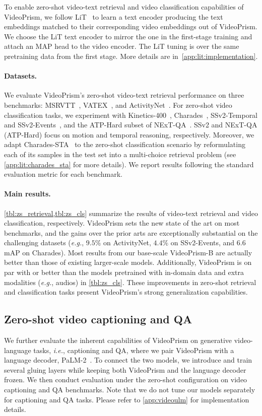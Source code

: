 \documentclass{article}
\theoremstyle{plain}
\theoremstyle{definition}
\theoremstyle{remark}
\newcommand{\OURS}{VideoPrism\xspace}
\newcommand{\ie}{\textit{i.e.}\xspace}
\newcommand{\eg}{\textit{e.g.}\xspace}
\newcommand{\myparagraph}[1]{\paragraph{#1}}
\begin{document}
To enable zero-shot video-text retrieval and video classification capabilities of \OURS, we follow LiT~\cite{zhai2022lit} to learn a text encoder producing the text embeddings matched to their corresponding video embeddings out of \OURS. We choose the LiT text encoder to mirror the one in the first-stage training and attach an MAP head to the video encoder. The LiT tuning is over the same pretraining data from the first stage. More details are in~\cref{app:lit:implementation}.

\myparagraph{Datasets.} We evaluate \OURS's zero-shot video-text retrieval performance on three benchmarks: MSRVTT~\cite{xu2016msr,bain2021frozen}, VATEX~\cite{wang2019vatex}, and ActivityNet~\cite{krishna2017dense}. For zero-shot video classification tasks, we experiment with Kinetics-400~\cite{kay2017kinetics}, Charades~\cite{sigurdsson2016hollywood}, SSv2-Temporal and SSv2-Events~\cite{sevilla2021only,bagad2023test}, and the ATP-Hard subset of NExT-QA~\cite{buch2022revisiting}. 
SSv2 and NExT-QA (ATP-Hard) focus on motion and temporal reasoning, respectively. 
Moreover, we adapt Charades-STA~\cite{gao2017tall} to the zero-shot classification scenario by reformulating each of its samples in the test set into a multi-choice retrieval problem (see \cref{app:lit:charades_sta} for more details). 
We report results following the standard evaluation metric for each benchmark.

\myparagraph{Main results.} \cref{tbl:zs_retrieval,tbl:zs_cls} summarize the results of video-text retrieval and video classification, respectively. \OURS sets the new state of the art on most benchmarks, and the gains over the prior arts are exceptionally substantial on the challenging datasets (\eg, $9.5\%$ on ActivityNet, $4.4\%$ on SSv2-Events, and $6.6$ mAP on Charades). Most results from our base-scale \OURS-B are actually better than those of existing larger-scale models. Additionally, \OURS is on par with or better than the models pretrained with in-domain data and extra modalities (\eg, audios) in \cref{tbl:zs_cls}. These improvements in zero-shot retrieval and classification tasks present \OURS's strong generalization capabilities.


\subsection{Zero-shot video captioning and QA}\label{sec:exp:cap_vqa} 


We further evaluate the inherent capabilities of \OURS on generative video-language tasks, \ie, captioning and QA, where we pair \OURS with a language decoder, PaLM-2~\cite{anil2023palm}. To connect the two models, we introduce and train several gluing layers while keeping both \OURS and the language decoder frozen. We then conduct evaluation under the zero-shot configuration on video captioning and QA benchmarks. Note that we do not tune our models separately for captioning and QA tasks. Please refer to \cref{app:videoulm} for implementation details.
\end{document}
